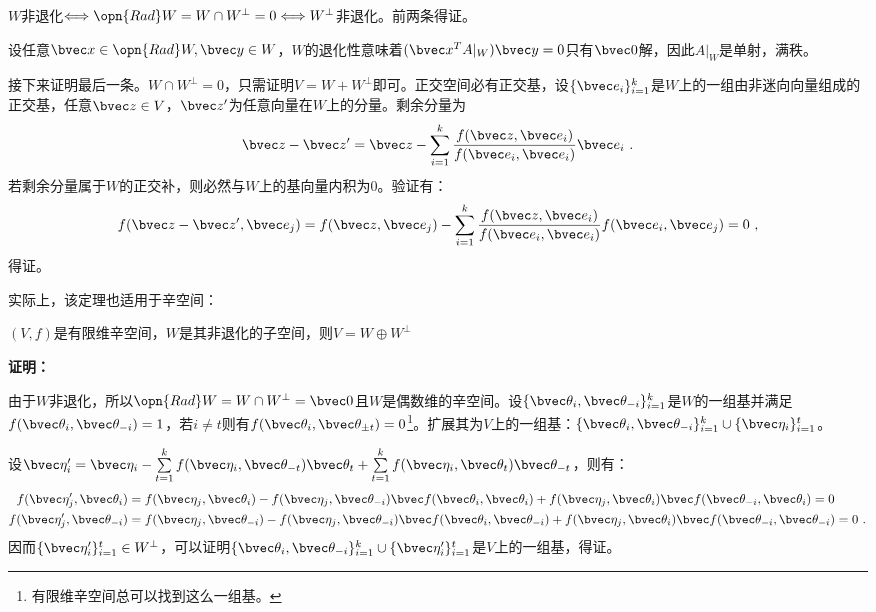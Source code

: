 $W$非退化$\Longleftrightarrow \opn{Rad}W=W\cap W^{\bot}=0\Longleftrightarrow  W^{\bot}$非退化。前两条得证。

设任意$\bvec x\in \opn{Rad} W,\bvec y\in W$，$W$的退化性意味着$(\bvec x^{T}A|_{W})\bvec  y=0$只有$\bvec 0$解，因此$A|_{W}$是单射，满秩。

接下来证明最后一条。$W\cap W^{\bot}=0$，只需证明$V=W+W^{\bot}$即可。正交空间必有正交基，设$\{\bvec e_i\}_{i=1}^k$是$W$上的一组由非迷向向量组成的正交基，任意$\bvec z\in V$，$\bvec z'$为任意向量在$W$上的分量。剩余分量为
\begin{equation}
\bvec z-\bvec z'=\bvec z-\sum\limits_{i=1}^k\frac{f(\bvec z,\bvec e_i)}{f(\bvec e_i,\bvec e_i)}\bvec e_i~.
\end{equation}
若剩余分量属于$W$的正交补，则必然与$W$上的基向量内积为$0$。验证有：
\begin{equation}
f(\bvec z-\bvec z',\bvec e_j)=f(\bvec z,\bvec e_j)-\sum\limits_{i=1}^k\frac{f(\bvec z,\bvec e_i)}{f(\bvec e_i,\bvec e_i)}f(\bvec e_i,\bvec e_j)=0~,
\end{equation}
得证。

实际上，该定理也适用于辛空间：
\begin{theorem}{}\label{the_OrSp_2}
$(V,f)$是有限维辛空间，$W$是其非退化的子空间，则$V=W\oplus W^{\bot}$
\end{theorem}
\textbf{证明：}

由于$W$非退化，所以$\opn{Rad} W=W\cap W^{\bot}={\bvec 0}$且$W$是偶数维的辛空间。设$\{\bvec \theta_i,\bvec \theta_{-i}\}_{i=1}^k$是$W$的一组基并满足$f(\bvec \theta_i,\bvec\theta_{-i})=1$，若$i\neq t$则有$f(\bvec\theta_i,\bvec\theta_{\pm t})= 0$\footnote{有限维辛空间总可以找到这么一组基。}。扩展其为$V$上的一组基：$\{\bvec \theta_i,\bvec \theta_{-i}\}_{i=1}^k\cup\{\bvec \eta_i\}_{i=1}^{t}$。

设$\bvec \eta'_i=\bvec\eta_i-\sum\limits_{t=1}^kf(\bvec \eta_i,\bvec \theta_{-t})\bvec\theta_t+\sum\limits_{t=1}^kf(\bvec\eta_i,\bvec\theta_t)\bvec\theta_{-t}$，则有：
\begin{equation}
\begin{aligned}
f(\bvec \eta'_j,\bvec  \theta_i)&=f(\bvec \eta_j,\bvec  \theta_i)-f(\bvec\eta_j,\bvec  \theta_{-i})\bvec f(\bvec \theta_i,\bvec \theta_i)+f(\bvec\eta_j,\bvec \theta_i)\bvec f(\bvec \theta_{-i},\bvec \theta_{i})=0\\
f(\bvec \eta'_j,\bvec  \theta_{-i})&=f(\bvec \eta_j,\bvec  \theta_{-i})-f(\bvec\eta_j,\bvec  \theta_{-i})\bvec f(\bvec \theta_i,\bvec \theta_{-i})+f(\bvec\eta_j,\bvec \theta_i)\bvec f(\bvec \theta_{-i},\bvec \theta_{-i})=0~.
\end{aligned}
\end{equation}
因而$\{\bvec \eta'_i\}_{i=1}^t\in W^{\bot}$，可以证明$\{\bvec \theta_i,\bvec \theta_{-i}\}_{i=1}^k\cup\{\bvec \eta'_i\}_{i=1}^t$是$V$上的一组基，得证。



